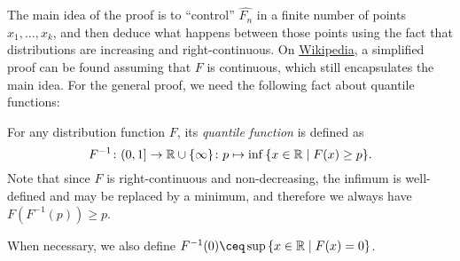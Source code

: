 The main idea of the proof is to ``control'' $\hat{F_n}$ in a finite number of points $x_1, \dotsc, x_k$, and then deduce what happens between those points using the fact that distributions are increasing and right-continuous. On \href{https://en.wikipedia.org/wiki/Glivenko%E2%80%93Cantelli_theorem#Proof}{Wikipedia}, 
	a simplified proof can be found assuming that $F$ is continuous, which still encapsulates the main idea.  For the general proof, we need the following fact about quantile functions:
	\begin{recap}
		For any distribution function $F$, its \emph{quantile function} is defined as
		\[
		F^{-1} \colon (0, 1] \to \mathbb R \cup \qty{\infty} \colon p \mapsto \inf \qty{x \in \mathbb R\mid F(x) \geq p}. 
		\]
		Note that since $F$ is right-continuous and non-decreasing, the infimum is well-defined and may be replaced by a minimum, and therefore we always have $F(F^{-1}(p)) \geq p$. 
		
		When necessary, we also define $F^{-1}(0) \ceq \sup\qty{x \in \RR \mid F(x) = 0}$.

	\end{recap}
	
